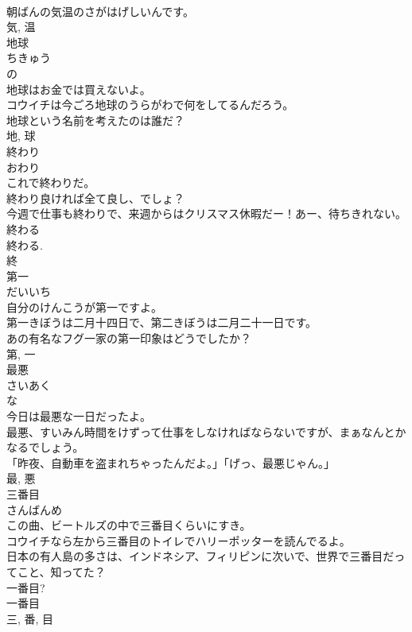 \documentclass[8pt]{extreport}
\begin{document}
\begin{CJK}{UTF8}{min}
\\	朝ばんの気温のさがはげしいんです。	
\\	気, 温	
\\	地球	
\\	ちきゅう	
\\	の 
\\	地球はお金では買えないよ。	
\\	コウイチは今ごろ地球のうらがわで何をしてるんだろう。	
\\	地球という名前を考えたのは誰だ？	
\\	地, 球	
\\	終わり	
\\	おわり	
\\	これで終わりだ。	
\\	終わり良ければ全て良し、でしょ？	
\\	今週で仕事も終わりで、来週からはクリスマス休暇だー！あー、待ちきれない。	
\\	終わる 
\\	終わる. 
\\	終	
\\	第一	
\\	だいいち	
\\	自分のけんこうが第一ですよ。	
\\	第一きぼうは二月十四日で、第二きぼうは二月二十一日です。	
\\	あの有名なフグ一家の第一印象はどうでしたか？	
\\	第, 一	
\\	最悪	
\\	さいあく	
\\	な 
\\	今日は最悪な一日だったよ。	
\\	最悪、すいみん時間をけずって仕事をしなければならないですが、まぁなんとかなるでしょう。	
\\	「昨夜、自動車を盗まれちゃったんだよ。」「げっ、最悪じゃん。」	
\\	最, 悪	
\\	三番目	
\\	さんばんめ	
\\	この曲、ビートルズの中で三番目くらいにすき。	
\\	コウイチなら左から三番目のトイレでハリーポッターを読んでるよ。	
\\	日本の有人島の多さは、インドネシア、フィリピンに次いで、世界で三番目だってこと、知ってた？	
\\	一番目? 
\\	一番目 
\\	三, 番, 目	

\end{CJK}
\end{document}
